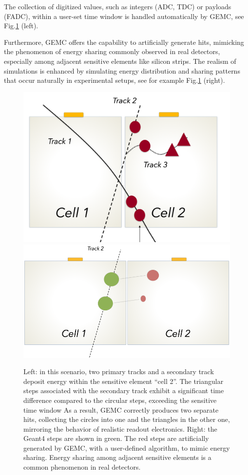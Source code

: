The collection of digitized values, such as integers (ADC, TDC)
or payloads (FADC), within a user-set time window is handled automatically by GEMC,
see Fig.\ref{fig:time_window_energy_sharing} (left).

Furthermore, GEMC offers the capability to artificially generate hits, mimicking the phenomenon of
energy sharing commonly observed in real detectors, especially among adjacent sensitive elements like silicon strips.
The realism of simulations is enhanced by simulating energy distribution and sharing patterns
that occur naturally in experimental setups, see for example Fig.\ref{fig:time_window_energy_sharing} (right).

\begin{figure}[h]
    \centering
    \includegraphics[width=.45\textwidth]{img/tw}
    \includegraphics[width=.54\textwidth]{img/e_sharing}
    \caption{Left: in this scenario, two primary tracks and a secondary track deposit energy within
    the sensitive element ``cell 2''. The triangular steps associated with the secondary track
    exhibit a significant time difference compared to the circular steps, exceeding the sensitive time window
    As a result, GEMC correctly produces two separate hits, collecting the circles into one and the triangles
    in the other one, mirroring the behavior of realistic readout electronics.
    Right: the Geant4 steps are shown in green. The red steps are artificially generated
    by GEMC, with a user-defined algorithm, to mimic energy sharing.
    Energy sharing among adjacent sensitive elements is a common phenomenon in real detectors.}
    \label{fig:time_window_energy_sharing}
\end{figure}

